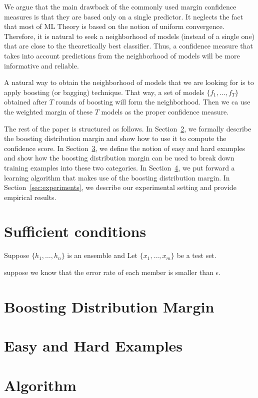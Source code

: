 \documentclass{article}
\begin{document}
We argue that the main drawback of the commonly used margin confidence measures is that they are based only on a single predictor. It neglects the fact that most of ML Theory is based on the notion of uniform convergence. Therefore, it is natural to seek a neighborhood of models (instead of a single one) that are close to the theoretically best classifier. Thus, a confidence measure that takes into account predictions from the neighborhood of models will be more informative and reliable.

A natural way to obtain the neighborhood of models that we are looking for is to apply boosting (or bagging) technique. That way, a set of models $\{f_{1}, \dots, f_{T}\}$ obtained after $T$ rounds of boosting will form the neighborhood. Then we ca use the weighted margin of these $T$ models as the proper confidence measure.
\fi

The rest of the paper is structured as follows. In
Section~\ref{sec:boosting_distribution_margin}, we formally describe the boosting distribution margin and
show how to use it to compute the confidence score. In
Section~\ref{sec:easy_ad_hard_examples}, we define the notion of easy and hard examples and show how the boosting distribution margin can be used to break down training examples into these two categories. In
Section~\ref{sec:algorithm}, we put forward a learning algorithm that makes use of the boosting distribution margin. In Section~\ref{sec:experiments}, we describe our experimental
setting and provide empirical results.

\section{Sufficient conditions}

Suppose $\{h_1,\ldots,h_n\}$ is an ensemble and Let $\{x_1,\ldots, x_m\}$ be a test set.

suppose we know that the error rate of each member is smaller than $\epsilon$.

\section{Boosting Distribution Margin}
\label{sec:boosting_distribution_margin}
\section{Easy and Hard Examples}
\label{sec:easy_ad_hard_examples}
\section{Algorithm}
\label{sec:algorithm}
\end{document}
